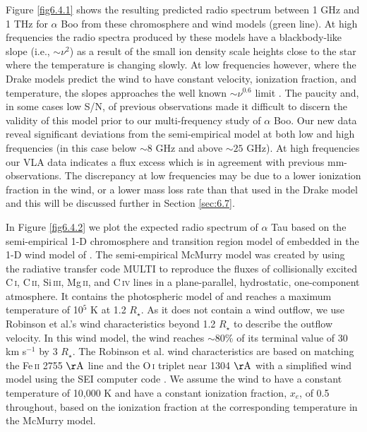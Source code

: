 Figure \ref{fig6.4.1} shows the resulting predicted radio spectrum between 1 GHz and 1 THz for $\alpha$ Boo from these chromosphere and wind models (green line). At high frequencies the radio spectra produced by these models have a blackbody-like slope (i.e., $\sim \nu ^{2}$) as a result of the small ion density scale heights close to the star where the temperature is changing slowly. At low frequencies however, where the Drake models predict the wind to have constant velocity, ionization fraction, and temperature, the slopes approaches the well known $\sim\nu ^{0.6}$ limit \citep{wright_1975,olnon_1975,panagia_1975}. The paucity and, in some cases low S/N, of previous observations made it difficult to discern the validity of this model prior to our multi-frequency study of $\alpha$ Boo. Our new data reveal significant deviations from the semi-empirical model at both low and high frequencies (in this case below $\sim 8$ GHz and above $\sim 25$ GHz). At high frequencies our VLA data indicates a flux excess which is in agreement with previous mm-observations. The discrepancy at low frequencies may be due to a lower ionization fraction in the wind, or a lower mass loss rate than that used in the Drake model and this will be discussed further in Section \ref{sec:6.7}.

In Figure \ref{fig6.4.2} we plot the expected radio spectrum of $\alpha$ Tau based on the semi-empirical 1-D chromosphere and transition region model of \cite{mcmurry_1999} embedded in the 1-D wind model of \cite{robinson_1998}. The semi-empirical McMurry model was created by using the radiative transfer code MULTI \citep{carlsson_1986} to reproduce the fluxes of collisionally excited C\,\textsc{i}, C\,\textsc{ii}, Si\,\textsc{iii}, Mg\,\textsc{ii}, and C\,\textsc{iv} lines in a plane-parallel, hydrostatic, one-component atmosphere. It contains the photospheric model of \cite{johnson_1973} and reaches a maximum temperature of 10$^{5}$ K at 1.2 $R_{\star}$. As it does not contain a wind outflow, we use Robinson et al.'s wind characteristics beyond 1.2 $R_{\star}$ to describe the outflow velocity. In this wind model, the wind reaches $\sim$80\% of its terminal value of 30 km s$^{-1}$ by 3 $R_{\star}$. The Robinson et al. wind characteristics are based on matching the Fe\,\textsc{ii} 2755 $\rm{\AA}$ line and the O\,\textsc{i} triplet near 1304 $\rm{\AA}$ with a simplified wind model using the SEI computer code \citep{lamers_1987}. We assume the wind to have a constant temperature of 10,000 K and have a constant ionization fraction, $x_{e}$, of 0.5 throughout, based on the ionization fraction at the corresponding temperature in the McMurry model.

